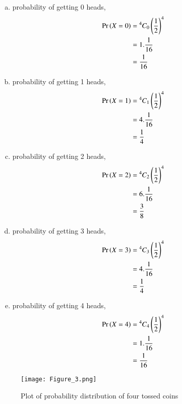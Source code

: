 \documentclass[journal,12pt,twocolumn]{IEEEtran}
\begin{document}
\begin{enumerate}[(i)]
\begin{enumerate}[(a)]
    \item probability of getting 0 heads,
        \begin{align}
            \begin{split}
                \Pr\left(X=0\right) &= {^4C_0}\left(\frac{1}{2}\right)^4\\
                &=1.\frac{1}{16}\\
                &=\frac{1}{16}
            \end{split}
        \end{align}

    \item probability of getting 1 heads,
        \begin{align}
            \begin{split}
                \Pr\left(X=1\right) &= {^4C_1}\left(\frac{1}{2}\right)^4\\
                &=4.\frac{1}{16}\\
                &=\frac{1}{4}
            \end{split}
        \end{align}

    \item probability of getting 2 heads,
        \begin{align}
            \begin{split}
                \Pr\left(X=2\right) &= {^4C_2}\left(\frac{1}{2}\right)^4\\
                &=6.\frac{1}{16}\\
                &=\frac{3}{8}
            \end{split}
        \end{align}

    \item probability of getting 3 heads,
        \begin{align}
            \begin{split}
                \Pr\left(X=3\right) &= {^4C_3}\left(\frac{1}{2}\right)^4\\
                &=4.\frac{1}{16}\\
                &=\frac{1}{4}
            \end{split}
        \end{align}

\item probability of getting 4 heads,
        \begin{align}
            \begin{split}
                \Pr\left(X=4\right) &= {^4C_4}\left(\frac{1}{2}\right)^4\\
                &=1.\frac{1}{16}\\
                &=\frac{1}{16}
            \end{split}
        \end{align}
\end{enumerate}

\begin{figure}[h!]
    \centering
    \texttt{[image: Figure\_3.png]}
    \caption{Plot of probability distribution of four tossed coins}
    \label{fig:Four coins}
\end{figure}
\end{enumerate}
\end{document}
